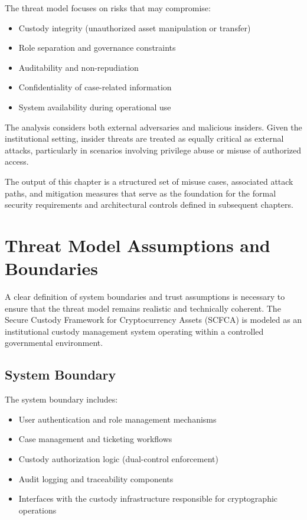 \documentclass[12pt,a4paper]{report}
\begin{document}
The threat model focuses on risks that may compromise:

\begin{itemize}
    \item Custody integrity (unauthorized asset manipulation or transfer)
    \item Role separation and governance constraints
    \item Auditability and non-repudiation
    \item Confidentiality of case-related information
    \item System availability during operational use
\end{itemize}

The analysis considers both external adversaries and malicious insiders. Given the institutional setting, insider threats are treated as equally critical as external attacks, particularly in scenarios involving privilege abuse or misuse of authorized access.

The output of this chapter is a structured set of misuse cases, associated attack paths, and mitigation measures that serve as the foundation for the formal security requirements and architectural controls defined in subsequent chapters.

\section{Threat Model Assumptions and Boundaries}

A clear definition of system boundaries and trust assumptions is necessary to ensure that the threat model remains realistic and technically coherent. The Secure Custody Framework for Cryptocurrency Assets (SCFCA) is modeled as an institutional custody management system operating within a controlled governmental environment.

\subsection{System Boundary}

The system boundary includes:

\begin{itemize}
    \item User authentication and role management mechanisms
    \item Case management and ticketing workflows
    \item Custody authorization logic (dual-control enforcement)
    \item Audit logging and traceability components
    \item Interfaces with the custody infrastructure responsible for cryptographic operations
\end{itemize}
\end{document}
